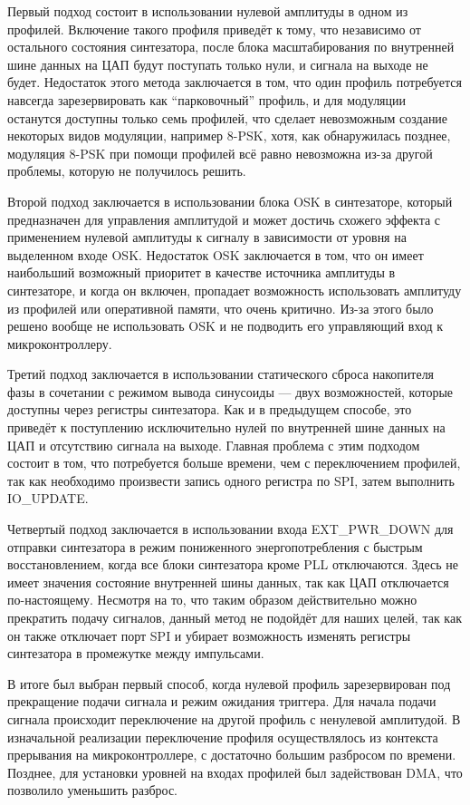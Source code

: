 \documentclass[rusmathsym, eqnumwithinsec, amspack, hyperref]{bomgost}
\begin{document}
Первый подход состоит в использовании нулевой амплитуды в одном из профилей. Включение такого профиля приведёт к тому, что независимо от остального состояния синтезатора, после блока масштабирования по внутренней шине данных на ЦАП будут поступать только нули, и сигнала на выходе не будет. Недостаток этого метода заключается в том, что один профиль потребуется навсегда зарезервировать как ``парковочный'' профиль, и для модуляции останутся доступны только семь профилей, что сделает невозможным создание некоторых видов модуляции, например 8-PSK, хотя, как обнаружилась позднее, модуляция 8-PSK при помощи профилей всё равно невозможна из-за другой проблемы, которую не получилось решить.

Второй подход заключается в использовании блока OSK в синтезаторе, который предназначен для управления амплитудой и может достичь схожего эффекта с применением нулевой амплитуды к сигналу в зависимости от уровня на выделенном входе OSK. Недостаток OSK заключается в том, что он имеет наибольший возможный приоритет в качестве источника амплитуды в синтезаторе, и когда он включен, пропадает возможность использовать амплитуду из профилей или оперативной памяти, что очень критично. Из-за этого было решено вообще не использовать OSK и не подводить его управляющий вход к микроконтроллеру.

Третий подход заключается в использовании статического сброса накопителя фазы в сочетании с режимом вывода синусоиды --- двух возможностей, которые доступны через регистры синтезатора. Как и в предыдущем способе, это приведёт к поступлению исключительно нулей по внутренней шине данных на ЦАП и отсутствию сигнала на выходе. Главная проблема с этим подходом состоит в том, что потребуется больше времени, чем с переключением профилей, так как необходимо произвести запись одного регистра по SPI, затем выполнить IO\_UPDATE.

Четвертый подход заключается в использовании входа EXT\_PWR\_DOWN для отправки синтезатора в режим пониженного энергопотребления с быстрым восстановлением, когда все блоки синтезатора кроме PLL отключаются. Здесь не имеет значения состояние внутренней шины данных, так как ЦАП отключается по-настоящему. Несмотря на то, что таким образом действительно можно прекратить подачу сигналов, данный метод не подойдёт для наших целей, так как он также отключает порт SPI и убирает возможность изменять регистры синтезатора в промежутке между импульсами.

В итоге был выбран первый способ, когда нулевой профиль зарезервирован под прекращение подачи сигнала и режим ожидания триггера. Для начала подачи сигнала происходит переключение на другой профиль с ненулевой амплитудой. В изначальной реализации переключение профиля осуществлялось из контекста прерывания на микроконтроллере, с достаточно большим разбросом по времени. Позднее, для установки уровней на входах профилей был задействован DMA, что позволило уменьшить разброс.
\end{document}
